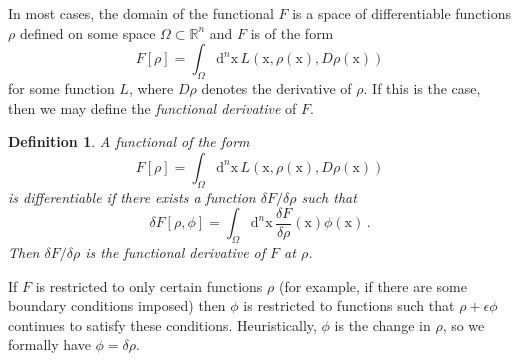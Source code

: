 \documentclass{article}
\theoremstyle{plain}\theoremheaderfont{\normalfont\itshape}\theorembodyfont{\rmfamily}\theoremseparator{.}\newtheorem*{rem}{Remark}\newtheorem*{ex}{Example}\newtheorem*{proof}{Proof}\newtheorem*{altp}{Alternative proof}
\theoremstyle{plain}\theoremheaderfont{\normalfont\bfseries}\theorembodyfont{\rmfamily}\theoremseparator{.}\newtheorem{thm}{Theorem}[section]\newtheorem{lem}[thm]{Lemma}\newtheorem{prop}[thm]{Proposition}\newtheorem*{cor}{Corollary}\newtheorem{defn}[thm]{Definition}\newtheorem{clm}[thm]{Claim}\newtheorem{clminproof}{Claim}
\theoremstyle{break}\theoremheaderfont{\normalfont\itshape}\theorembodyfont{\rmfamily}\theoremseparator{.\medskip}\newtheorem*{proofskip}{Proof}\newtheorem*{exs}{Examples}\newtheorem*{rems}{Remarks}
\theoremstyle{break}\theoremheaderfont{\normalfont\bfseries}\theorembodyfont{\rmfamily}\theoremseparator{.\medskip}\newtheorem{lemskip}[thm]{Lemma}\newtheorem{defnskip}[thm]{Definition}\newtheorem{propskip}[thm]{Proposition}\newtheorem{thmskip}[thm]{Theorem}
\numberwithin{equation}{section}
\newcommand{\dd}[2][]{\mathrm{d}^{#1} #2\,}
\newcommand{\vb}[1]{\bm{\mathrm{#1}}}
\begin{document}
    In most cases, the domain of the functional \(F\) is a space of differentiable functions \(\rho\) defined on some space \(\Omega\subset\mathbb{R}^n\) and \(F\) is of the form
    \begin{equation}
        F[\rho]=\int_{\Omega}\dd[n]{\vb{x}}L(\vb{x},\rho(\vb{x}),D\rho(\vb{x}))
    \end{equation}
    for some function \(L\), where \(D\rho\) denotes the derivative of \(\rho\). If this is the case, then we may define the \textit{functional derivative} of \(F\).
    \begin{defn}
        A functional of the form
        \begin{equation}
            F[\rho]=\int_{\Omega}\dd[n]{\vb{x}}L(\vb{x},\rho(\vb{x}),D\rho(\vb{x}))
        \end{equation}
        is \textit{differentiable} if there exists a function \(\delta F/\delta \rho\) such that
        \begin{equation}
            \delta F[\rho,\phi]=\int_{\Omega}\dd[n]{\vb{x}}\frac{\delta F}{\delta \rho}(\vb{x})\phi(\vb{x})\,.
        \end{equation}
        Then \(\delta F/\delta \rho\) is the \textit{functional derivative} of \(F\) at \(\rho\).
    \end{defn}
    If \(F\) is restricted to only certain functions \(\rho\) (for example, if there are some boundary conditions imposed) then \(\phi\) is restricted to functions such that \(\rho+\epsilon\phi\) continues to satisfy these conditions. Heuristically, \(\phi\) is the change in \(\rho\), so we formally have \(\phi=\delta \rho\).
\end{document}
